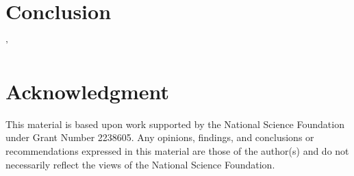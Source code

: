 \documentclass[conference]{IEEEtran}
\begin{document}
\section{Conclusion}
'

\section*{Acknowledgment}
\small
This material is based upon work supported by the National Science Foundation under Grant Number 2238605. Any opinions, findings, and conclusions or recommendations expressed in this material are those of the author(s) and do not necessarily reflect the views of the National Science Foundation.




\end{document}
